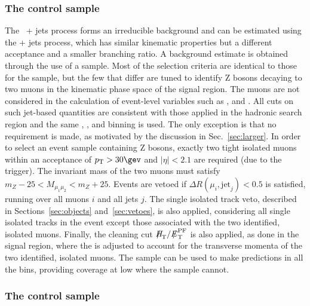 \subsubsection{The \texorpdfstring{\mmj}{di-muon plus jets} control sample}

The \znunu\ + jets process forms an irreducible background and can be
estimated using the \zmumu + jets process, which has similar kinematic
properties but a different acceptance and a smaller branching ratio. A
background estimate is obtained through the use of a \mmj sample. Most
of the selection criteria are identical to those for the \mj sample,
but the few that differ are tuned to identify Z bosons decaying to two
muons in the kinematic phase space of the signal region. The muons are
not considered in the calculation of event-level variables such as
\scalht, \mht and \alphat. All cuts on such jet-based quantities are
consistent with those applied in the hadronic search region and the
same \njet, \nb, and \scalht binning is used. The only exception is
that no \alphat requirement is made, as motivated by the discussion in
Sec.~\ref{sec:larger}. In order to select an event sample containing Z
bosons, exactly two tight isolated muons within an acceptance of $\Pt
> 30\gev$ and $|\eta| < 2.1$ are required (due to the trigger). The
invariant mass of the two muons must satisfy $m_{Z} - 25 <
M_{\mu_1\mu_2} < m_{Z} + 25$. Events are vetoed if $\Delta
R(\mu_{i},\textrm{jet}_j) < 0.5$ is satisfied, running over all muons
$i$ and all jets $j$. The single isolated track veto, described in
Sections~\ref{sec:objects} and~\ref{sec:vetoes}, is also
applied, considering all single isolated tracks in the event except
those associated with the two identified, isolated muons. Finally, the
cleaning cut $\mht/\pfmet$ is also applied, as done in the signal
region, where the \pfmet is adjusted to account for the transverse
momenta of the two identified, isolated muons. The \mmj sample can be
used to make predictions in all the \scalht bins, providing coverage
at low \scalht where the \gj sample cannot.

\subsubsection{The \texorpdfstring{\gj}{photon plus jets} control sample}
\label{subsec:photoncontrolSelection}

